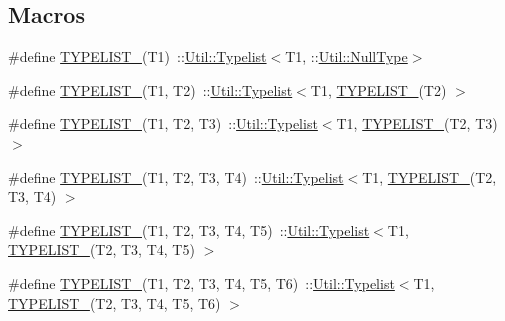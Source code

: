 \subsection*{Macros}
\begin{DoxyCompactItemize}
\item 
\#define \mbox{\hyperlink{adat-devel_2lib_2adat_2typelist_8h_a6a7a6aa3dece450c8d239713e2952df7}{T\+Y\+P\+E\+L\+I\+S\+T\+\_}}(T1)~\+::\mbox{\hyperlink{structUtil_1_1Typelist}{Util\+::\+Typelist}}$<$T1, \+::\mbox{\hyperlink{classUtil_1_1NullType}{Util\+::\+Null\+Type}}$>$
\item 
\#define \mbox{\hyperlink{adat-devel_2lib_2adat_2typelist_8h_a311cb99af993804c6737ae46c5cbfaff}{T\+Y\+P\+E\+L\+I\+S\+T\+\_}}(T1,  T2)~\+::\mbox{\hyperlink{structUtil_1_1Typelist}{Util\+::\+Typelist}}$<$T1, \mbox{\hyperlink{adat__devel__install_2include_2adat_2typelist_8h_a6a7a6aa3dece450c8d239713e2952df7}{T\+Y\+P\+E\+L\+I\+S\+T\+\_}}(T2) $>$
\item 
\#define \mbox{\hyperlink{adat-devel_2lib_2adat_2typelist_8h_a0309f68a543c5c0994f9edc0e56dc59f}{T\+Y\+P\+E\+L\+I\+S\+T\+\_}}(T1,  T2,  T3)~\+::\mbox{\hyperlink{structUtil_1_1Typelist}{Util\+::\+Typelist}}$<$T1, \mbox{\hyperlink{adat__devel__install_2include_2adat_2typelist_8h_a311cb99af993804c6737ae46c5cbfaff}{T\+Y\+P\+E\+L\+I\+S\+T\+\_}}(T2, T3) $>$
\item 
\#define \mbox{\hyperlink{adat-devel_2lib_2adat_2typelist_8h_a7a156c571ab21a16b0495e1c882a07fa}{T\+Y\+P\+E\+L\+I\+S\+T\+\_}}(T1,  T2,  T3,  T4)~\+::\mbox{\hyperlink{structUtil_1_1Typelist}{Util\+::\+Typelist}}$<$T1, \mbox{\hyperlink{adat__devel__install_2include_2adat_2typelist_8h_a0309f68a543c5c0994f9edc0e56dc59f}{T\+Y\+P\+E\+L\+I\+S\+T\+\_}}(T2, T3, T4) $>$
\item 
\#define \mbox{\hyperlink{adat-devel_2lib_2adat_2typelist_8h_aad5d9b3c82c8503c85c625acd41c0a2f}{T\+Y\+P\+E\+L\+I\+S\+T\+\_}}(T1,  T2,  T3,  T4,  T5)~\+::\mbox{\hyperlink{structUtil_1_1Typelist}{Util\+::\+Typelist}}$<$T1, \mbox{\hyperlink{adat__devel__install_2include_2adat_2typelist_8h_a7a156c571ab21a16b0495e1c882a07fa}{T\+Y\+P\+E\+L\+I\+S\+T\+\_}}(T2, T3, T4, T5) $>$
\item 
\#define \mbox{\hyperlink{adat-devel_2lib_2adat_2typelist_8h_ac6f3277dcaade98ceeaa5c0e1c454816}{T\+Y\+P\+E\+L\+I\+S\+T\+\_}}(T1,  T2,  T3,  T4,  T5,  T6)~\+::\mbox{\hyperlink{structUtil_1_1Typelist}{Util\+::\+Typelist}}$<$T1, \mbox{\hyperlink{adat__devel__install_2include_2adat_2typelist_8h_aad5d9b3c82c8503c85c625acd41c0a2f}{T\+Y\+P\+E\+L\+I\+S\+T\+\_}}(T2, T3, T4, T5, T6) $>$

\end{DoxyCompactItemize}
